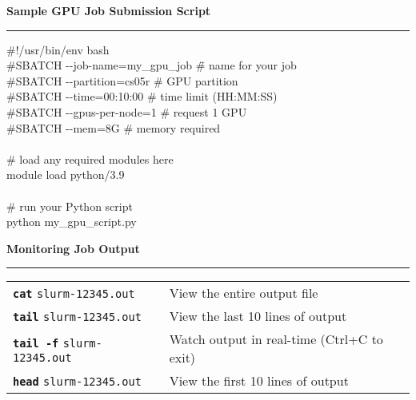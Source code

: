 \documentclass[11pt, a4paper, landscape]{article}
\newcommand{\slcmd}[1]{\textcolor{mainblue}{\texttt{\textbf{#1}}}}
\newcommand{\slopt}[1]{\textcolor{optiongreen}{\texttt{#1}}}
\begin{document}
\begin{tcolorbox}[colback=white, colframe=bordercolor, boxrule=1pt, arc=5mm, left=4mm, right=4mm, top=4mm, bottom=4mm]
\textbf{\large Sample GPU Job Submission Script}\\[-3mm]
\textcolor{mainblue}{\rule{\dimexpr\linewidth-8mm\relax}{2pt}}
\vspace{2mm}

\begin{tcolorbox}[colback=lightgray!50, colframe=bordercolor!70, boxrule=2pt, arc=4mm, left=3mm, right=3mm, top=2mm, bottom=2mm]
\small\ttfamily
\begin{tabbing}
\#!/usr/bin/env bash\\
\#SBATCH -{}-job-name=my\_gpu\_job \hspace{8mm} \= \# name for your job\\
\#SBATCH -{}-partition=cs05r \> \# GPU partition\\
\#SBATCH -{}-time=00:10:00 \> \# time limit (HH:MM:SS)\\
\#SBATCH -{}-gpus-per-node=1 \> \# request 1 GPU\\
\#SBATCH -{}-mem=8G \> \# memory required\\
\\
\# load any required modules here\\
module load python/3.9\\
\\
\# run your Python script\\
python my\_gpu\_script.py
\end{tabbing}
\end{tcolorbox}
\end{tcolorbox}

\vspace{3mm}

\begin{tcolorbox}[colback=white, colframe=bordercolor, boxrule=1pt, arc=5mm, left=4mm, right=4mm, top=4mm, bottom=4mm]
\textbf{\large Monitoring Job Output}\\[-3mm]
\textcolor{mainblue}{\rule{\dimexpr\linewidth-8mm\relax}{2pt}}
\vspace{2mm}

\small
\begin{tabular}{@{}p{}p{}@{}}
\slcmd{cat} \slopt{slurm-12345.out} & View the entire output file \\[1.5mm]
\slcmd{tail} \slopt{slurm-12345.out} & View the last 10 lines of output \\[1.5mm]
\slcmd{tail -f} \slopt{slurm-12345.out} & Watch output in real-time (Ctrl+C to exit) \\[1.5mm]
\slcmd{head} \slopt{slurm-12345.out} & View the first 10 lines of output \\
\end{tabular}
\end{tcolorbox}
\end{document}

